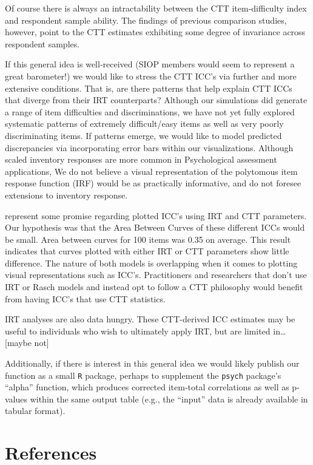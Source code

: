 \documentclass[
  man]{apa6}
\begin{document}
Of course there is always an intractability between the CTT item-difficulty index and respondent sample ability. The findings of previous comparison studies, however, point to the CTT estimates exhibiting some degree of invariance across respondent samples.

If this general idea is well-received (SIOP members would seem to represent a great barometer!) we would like to stress the CTT ICC's via further and more extensive conditions. That is, are there patterns that help explain CTT ICCs that diverge from their IRT counterparts? Although our simulations did generate a range of item difficulties and discriminations, we have not yet fully explored systematic patterns of extremely difficult/easy items as well as very poorly discriminating items. If patterns emerge, we would like to model predicted discrepancies via incorporating error bars within our visualizations. Although scaled inventory responses are more common in Psychological assessment applications, We do not believe a visual representation of the polytomous item response function (IRF) would be as practically informative, and do not foresee extensions to inventory response.

represent some promise regarding plotted ICC's using IRT and CTT parameters. Our hypothesis was that the Area Between Curves of these different ICCs would be small. Area between curves for 100 items was 0.35 on average. This result indicates that curves plotted with either IRT or CTT parameters show little difference. The nature of both models is overlapping when it comes to plotting visual representations such as ICC's. Practitioners and researchers that don't use IRT or Rasch models and instead opt to follow a CTT philosophy would benefit from having ICC's that use CTT statistics.

IRT analyses are also data hungry. These CTT-derived ICC estimates may be useful to individuals who wish to ultimately apply IRT, but are limited in\ldots{} {[}maybe not{]}

Additionally, if there is interest in this general idea we would likely publish our function as a small \texttt{R} package, perhaps to supplement the \texttt{psych} package's ``alpha'' function, which produces corrected item-total correlations as well as p-values within the same output table (e.g., the ``input'' data is already available in tabular format).

\newpage

\hypertarget{references}{%
\section{References}\label{references}}
\end{document}
